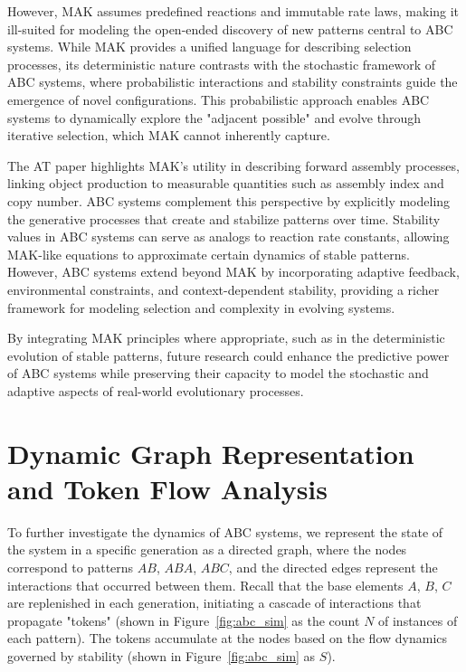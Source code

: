 \documentclass[entropy,article,submit,pdftex,oneauthor]{Definitions/mdpi}
\begin{document}
However, MAK assumes predefined reactions and immutable rate laws, making it ill-suited for modeling the open-ended discovery of new patterns central to ABC systems. While MAK provides a unified language for describing selection processes, its deterministic nature contrasts with the stochastic framework of ABC systems, where probabilistic interactions and stability constraints guide the emergence of novel configurations. This probabilistic approach enables ABC systems to dynamically explore the "adjacent possible" \cite{kauffman1996investigations} and evolve through iterative selection, which MAK cannot inherently capture.

The AT paper \cite{walker2023nature} highlights MAK’s utility in describing forward assembly processes, linking object production to measurable quantities such as assembly index and copy number. ABC systems complement this perspective by explicitly modeling the generative processes that create and stabilize patterns over time. Stability values in ABC systems can serve as analogs to reaction rate constants, allowing MAK-like equations to approximate certain dynamics of stable patterns. However, ABC systems extend beyond MAK by incorporating adaptive feedback, environmental constraints, and context-dependent stability, providing a richer framework for modeling selection and complexity in evolving systems.

By integrating MAK principles where appropriate, such as in the deterministic evolution of stable patterns, future research could enhance the predictive power of ABC systems while preserving their capacity to model the stochastic and adaptive aspects of real-world evolutionary processes.

\section{Dynamic Graph Representation and Token Flow Analysis}

To further investigate the dynamics of ABC systems, we represent the state of the system in a specific generation as a directed graph, where the nodes correspond to patterns $AB$, $ABA$, $ABC$, and the directed edges represent the interactions that occurred between them. Recall that the base elements $A$, $B$, $C$ are replenished in each generation, initiating a cascade of interactions that propagate "tokens" (shown in Figure~\ref{fig:abc_sim} as the count $N$ of instances of each pattern). The tokens accumulate at the nodes based on the flow dynamics governed by stability (shown in Figure~\ref{fig:abc_sim} as $S$).
\end{document}
